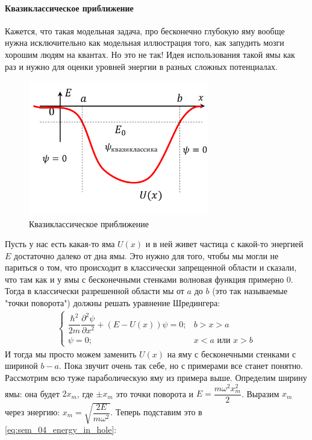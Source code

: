 \documentclass[12pt]{article}
\begin{document}
\paragraph{Квазиклассическое приближение}
Кажется, что такая модельная задача, про бесконечно глубокую яму вообще нужна исключительно как модельная иллюстрация того, как запудить мозги хорошим людям на квантах. Но это не так! Идея использования такой ямы как раз и нужно для оценки уровней энергии в разных сложных потенциалах.\\
\begin{figure}[h]
    \centering
    \includegraphics[width=0.7\textwidth,height=\textheight,keepaspectratio]{Seminar_04/pics/pic_04.pdf}
    \caption{Квазиклассическое приближение}
\end{figure}
Пусть у нас есть какая-то яма $U(x)$ и в ней живет частица с какой-то энергией $E$ достаточно далеко от дна ямы. Это нужно для того, чтобы мы могли не париться о том, что происходит в классически запрещенной области и сказали, что там как и у ямы с бесконечными стенками волновая функция примерно 0. Тогда в классически разрешенной области мы от $a$ до $b$ (это так называемые "точки поворота") должны решать уравнение Шредингера:
\begin{gather*}
    \begin{cases}
         \dfrac{\hbar^2}{2m}\dfrac{\partial^2\psi}{\partial x^2} +  (E-U(x))\psi=0; &b>x>a  \\[10pt]
         \psi=0;  &x<a \text{ или } x>b 
    \end{cases}
\end{gather*}
И тогда мы просто можем заменить $U(x)$ на яму с бесконечными стенками с шириной $b-a$. Пока звучит очень так себе, но с примерами все станет понятно.
\\Рассмотрим всю туже параболическую яму из примера выше. Определим ширину ямы: она будет $2x_m$, где $\pm x_m$ это точки поворота и $E = \dfrac{m\omega^2x_m^2}{2}$. Выразим $x_m$ через энергию: $x_m=\sqrt{\dfrac{2E}{m\omega^2}}$. Теперь подставим это в \ref{eq:sem_04_energy_in_hole}:
\end{document}
